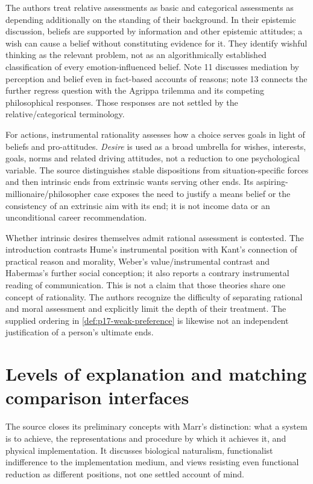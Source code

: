 The authors treat relative assessments as basic and categorical
assessments as depending additionally on the standing of their background.
In their epistemic discussion, beliefs are supported by information
and other epistemic attitudes; a wish can cause a belief without
constituting evidence for it. They identify wishful thinking as the
relevant problem, not as an algorithmically established classification
of every emotion-influenced belief. Note 11 discusses mediation by
perception and belief even in fact-based accounts of reasons; note 13
connects the further regress question with the Agrippa trilemma and
its competing philosophical responses. Those responses are not
settled by the relative/categorical terminology.

For actions, instrumental rationality assesses how a choice serves
goals in light of beliefs and pro-attitudes. \emph{Desire} is used
as a broad umbrella for wishes, interests, goals, norms and related
driving attitudes, not a reduction to one psychological variable.
The source distinguishes stable dispositions from situation-specific
forces and then intrinsic ends from extrinsic wants serving other ends.
Its aspiring-millionaire/philosopher case exposes the need to justify
a means belief or the consistency of an extrinsic aim with its end;
it is not income data or an unconditional career recommendation.

Whether intrinsic desires themselves admit rational assessment is
contested. The introduction contrasts Hume's instrumental position
with Kant's connection of practical reason and morality, Weber's
value/instrumental contrast and Habermas's further social conception;
it also reports a contrary instrumental reading of communication.
This is not a claim that those theories share one concept of rationality.
The authors recognize the difficulty of separating rational and moral
assessment and explicitly limit the depth of their treatment.
The supplied ordering in \cref{def:p17-weak-preference} is likewise
not an independent justification of a person's ultimate ends.

\section{Levels of explanation and matching comparison interfaces}

The source closes its preliminary concepts with Marr's distinction:
what a system is to achieve, the representations and procedure by
which it achieves it, and physical implementation. It discusses
biological naturalism, functionalist indifference to the implementation
medium, and views resisting even functional reduction as different
positions, not one settled account of mind.

